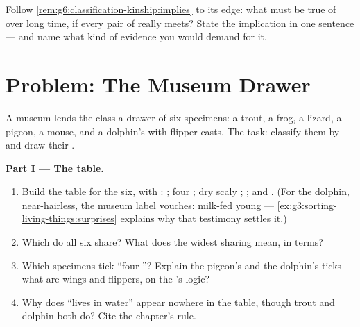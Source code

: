 \begin{exercise}[$\star\star\star$]\label{exo:g6:classification-kinship:12}
Follow \cref{rem:g6:classification-kinship:implies} to its
edge: what must be true of  over long time, if
every pair of  really meets? State the implication
in one sentence --- and name what kind of evidence you
would demand for it.
\end{exercise}

\section{Problem: The Museum Drawer}

\begin{problem}\label{pb:g6:classification-kinship:1}
A museum lends the class a drawer of six specimens: a
trout, a frog, a lizard, a pigeon, a mouse, and a
dolphin's  with flipper casts. The task: classify
them by  and draw their  .

\medskip\noindent\textbf{Part I --- The table.}
\begin{enumerate}
  \item Build the table for the six, with :
        ; four ; dry scaly ; ;
         and . (For the dolphin, near-hairless,
        the museum label vouches: milk-fed young ---
        \cref{ex:g3:sorting-living-things:surprises}
        explains why that testimony settles it.)
  \item Which  do all six share? What does the
        widest sharing mean, in  terms?
  \item Which specimens tick ``four ''? Explain the
        pigeon's and the dolphin's ticks --- what are
        wings and flippers, on the 's logic?
  \item Why does ``lives in water'' appear nowhere in the
        table, though trout and dolphin both do? Cite the
        chapter's rule.
\end{enumerate}


\end{problem}
